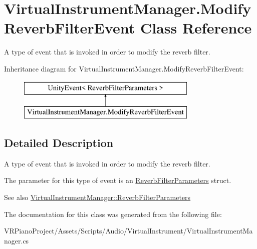 \hypertarget{class_virtual_instrument_manager_1_1_modify_reverb_filter_event}{}\section{Virtual\+Instrument\+Manager.\+Modify\+Reverb\+Filter\+Event Class Reference}
\label{class_virtual_instrument_manager_1_1_modify_reverb_filter_event}


A type of event that is invoked in order to modify the reverb filter.  


Inheritance diagram for Virtual\+Instrument\+Manager.\+Modify\+Reverb\+Filter\+Event\+:\begin{figure}[H]
\begin{center}
\leavevmode
\includegraphics[height=2.000000cm]{class_virtual_instrument_manager_1_1_modify_reverb_filter_event}
\end{center}
\end{figure}


\subsection{Detailed Description}
A type of event that is invoked in order to modify the reverb filter. 

The parameter for this type of event is an \hyperlink{class_virtual_instrument_manager_struct_virtual_instrument_manager_1_1_reverb_filter_parameters}{Reverb\+Filter\+Parameters} struct.

\begin{DoxySeeAlso}{See also}
\hyperlink{class_virtual_instrument_manager_struct_virtual_instrument_manager_1_1_reverb_filter_parameters}{Virtual\+Instrument\+Manager\+::\+Reverb\+Filter\+Parameters} 
\end{DoxySeeAlso}


The documentation for this class was generated from the following file\+:\begin{DoxyCompactItemize}
\item 
V\+R\+Piano\+Project/\+Assets/\+Scripts/\+Audio/\+Virtual\+Instrument/Virtual\+Instrument\+Manager.\+cs\end{DoxyCompactItemize}
